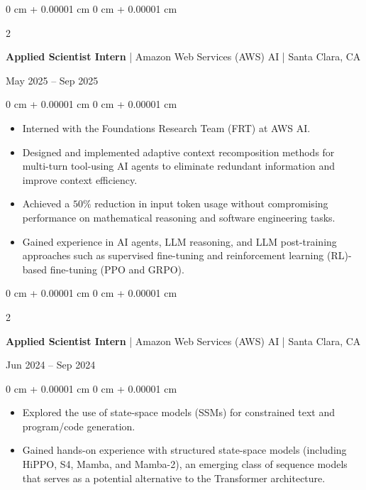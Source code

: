 \documentclass[10pt, letterpaper]{article}
\newenvironment{highlights}{
    \begin{itemize}[
        topsep=0.10 cm,
        parsep=0.10 cm,
        partopsep=0pt,
        itemsep=0pt,
        leftmargin=0 cm + 10pt
    ]
}{
    \end{itemize}
} %
\newenvironment{onecolentry}{
    \begin{adjustwidth}{
        0 cm + 0.00001 cm
    }{
        0 cm + 0.00001 cm
    }
}{
    \end{adjustwidth}
} %
\newenvironment{twocolentry}[2][]{
    \onecolentry
    \def\secondColumn{#2}
    \setcolumnwidth{\fill, 4.5 cm}
    \begin{paracol}{2}
}{
    \switchcolumn \raggedleft \secondColumn\strut
    \end{paracol}
    \endonecolentry
} %
\begin{document}
        \begin{twocolentry}{May 2025 – Sep 2025}
        \textbf{Applied Scientist Intern} | Amazon Web Services (AWS) AI | Santa Clara, CA
        \end{twocolentry}
        \vspace{0.10 cm}
        \begin{onecolentry}
            \begin{highlights}
                \item Interned with the Foundations Research Team (FRT) at AWS AI.
                \item Designed and implemented adaptive context recomposition methods for multi-turn tool-using AI agents to eliminate redundant information and improve context efficiency. 
                \item Achieved a $50 \%$ reduction in input token usage without compromising performance on mathematical reasoning and software engineering tasks.
                \item Gained experience in AI agents, LLM reasoning, and LLM post-training approaches such as supervised fine-tuning and reinforcement learning (RL)-based fine-tuning (PPO and GRPO).
            \end{highlights}
        \end{onecolentry}

        \vspace{0.2 cm}

        \begin{twocolentry}{Jun 2024 – Sep 2024}
        \textbf{Applied Scientist Intern} | Amazon Web Services (AWS) AI | Santa Clara, CA
        \end{twocolentry}
        \vspace{0.10 cm}
        \begin{onecolentry}
            \begin{highlights}
                \item Explored the use of state-space models (SSMs) for constrained text and program/code generation.
                \item Gained hands-on experience with structured state-space models (including HiPPO, S4, Mamba, and Mamba-2), an emerging class of sequence models that serves as a potential alternative to the Transformer architecture.
            \end{highlights}
        \end{onecolentry}

        \vspace{0.2 cm}
\end{document}
